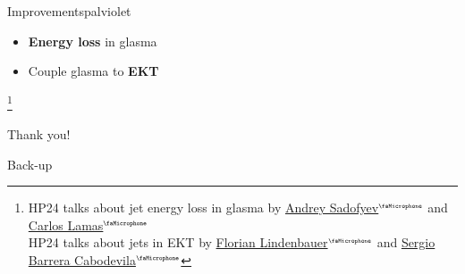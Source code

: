 \documentclass[aspectratio=169,11pt,usenames,dvipsnames]{beamer}
\renewcommand{\thefootnote}{\color{customblue}\faPaperPlaneO}
\newcommand\blfootnote[1]{%
  \begingroup
  \renewcommand\thefootnote{}\footnote{#1}%
  \addtocounter{footnote}{-1}%
  \endgroup
}
\begin{document}
\begin{frame}
\begin{center}

        \begin{custombox2}{Improvements}{palviolet}
            \small
            \begin{varwidth}{0.3\textwidth}
            \begin{itemize}\itemsep0em 
                \itemsep0em
                \item \textbf{\color{palviolet}Energy loss} in glasma
                \item Couple glasma to \textbf{\color{palviolet}EKT}
            \end{itemize}
            \end{varwidth}
        \end{custombox2}
    \end{center}

    \blfootnote{\scriptsize HP24 talks about jet energy loss in glasma by \href{https://indico.cern.ch/event/1339555/contributions/6040922/}{{\color{palviolet}Andrey Sadofyev$^\text{\tiny\faMicrophone}$}} and \href{https://indico.cern.ch/event/1339555/contributions/6040797/}{{\color{palviolet}Carlos Lamas$^\text{\tiny\faMicrophone}$}}\\
    \hspace{16.5pt}HP24 talks about jets in EKT by \href{https://indico.cern.ch/event/1339555/contributions/6040912/}{{\color{palviolet}Florian Lindenbauer$^\text{\tiny\faMicrophone}$}} and \href{https://indico.cern.ch/event/1339555/contributions/6040914/}{{\color{palviolet}Sergio Barrera Cabodevila$^\text{\tiny\faMicrophone}$}}
    }
\end{frame}

\begin{frame}{}
    \vspace{20pt}
    \huge\centering Thank you!
\end{frame}

\appendix

\begin{frame}{}
    \huge\centering Back-up
\end{frame}
\end{document}
